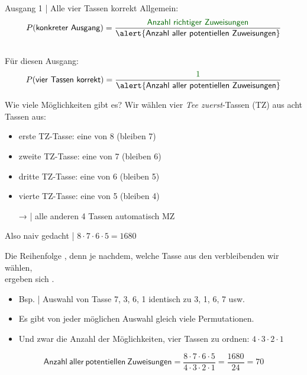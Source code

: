 \begin{frame}
  {Ausgang 1 | Alle vier Tassen korrekt}
  Allgemein:\\
  \Viertelzeile
  \begin{equation}
    P(\mathsf{konkreter\ Ausgang})=\frac{\gruen{\mathsf{Anzahl\ richtiger\ Zuweisungen}}}{\alert{\mathsf{Anzahl\ aller\ potentiellen\ Zuweisungen}}}
  \end{equation}\\
  \Zeile
  Für diesen Ausgang:\\
  \Viertelzeile
  \begin{equation}
    P(\mathsf{vier\ Tassen\ korrekt})=\frac{\gruen{1}}{\alert{\mathsf{Anzahl\ aller\ potentiellen\ Zuweisungen}}}
  \end{equation}
\end{frame}

\begin{frame}
  {Wie viele Möglichkeiten gibt es?}
  Wir wählen \alert{vier \textit{Tee zuerst}-Tassen (TZ) aus acht Tassen} aus:\\
  \Halbzeile
  \begin{itemize}[<+->]
    \item erste TZ-Tasse: eine von 8 (bleiben 7)
    \item zweite TZ-Tasse: eine von 7 (bleiben 6)
    \item dritte TZ-Tasse: eine von 6 (bleiben 5)
    \item vierte TZ-Tasse: eine von 5 (bleiben 4)
      \Halbzeile
    \item[→]  | alle anderen 4 Tassen automatisch MZ
  \end{itemize}
  \Zeile
  \centering 
  Also naiv gedacht | \alert{$8\cdot7\cdot6\cdot5=1680$}
\end{frame}

\begin{frame}
  {Die Reihenfolge}
  , denn je nachdem, welche Tasse aus den verbleibenden wir wählen,\\
  ergeben sich .\\
  \Zeile
  \begin{itemize}[<+->]
    \item Bsp. | Auswahl von Tasse 7, 3, 6, 1 identisch zu 3, 1, 6, 7 usw.
      \Halbzeile
    \item Es gibt von jeder möglichen Auswahl gleich viele Permutationen.
    \item Und zwar die Anzahl der \alert{Möglichkeiten, vier Tassen zu ordnen: $4\cdot3\cdot2\cdot1$}
      \Zeile
  \end{itemize}
  \Zeile
  \begin{equation}
    \mathsf{Anzahl\ aller\ potentiellen\ Zuweisungen}=\frac{8\cdot7\cdot6\cdot5}{4\cdot3\cdot2\cdot1}=\frac{1680}{24}=70
  \end{equation}
\end{frame}

